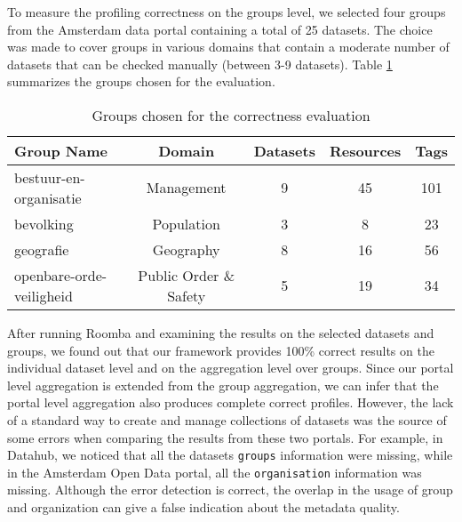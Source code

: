 To measure the profiling correctness on the groups level, we selected four groups from the Amsterdam data portal containing a total of 25 datasets. The choice was made to cover groups in various domains that contain a moderate number of datasets that can be checked manually (between 3-9 datasets). Table \ref{table:groups_experiment} summarizes the groups chosen for the evaluation.

\begin{table}[ht]
\centering
\begin{tabular}{|l|c|c|c|c|}
\hline
\textbf{Group Name}      & \textbf{Domain}        & \multicolumn{1}{l|}{\textbf{Datasets}} & \multicolumn{1}{l|}{\textbf{Resources}} & \multicolumn{1}{l|}{\textbf{Tags}} \\ \hline
bestuur-en-organisatie   & Management             & 9                                      & 45                                      & 101                                \\ \hline
bevolking                & Population             & 3                                      & 8                                       & 23                                 \\ \hline
geografie                & Geography              & 8                                      & 16                                      & 56                                 \\ \hline
openbare-orde-veiligheid & Public Order \& Safety & 5                                      & 19                                      & 34                                 \\ \hline
\end{tabular}
\caption{Groups chosen for the correctness evaluation}
\label{table:groups_experiment}
\end{table}

After running Roomba and examining the results on the selected datasets and groups, we found out that our framework provides 100\% correct results on the individual dataset level and on the aggregation level over groups. Since our portal level aggregation is extended from the group aggregation, we can infer that the portal level aggregation also produces complete correct profiles. However, the lack of a standard way to create and manage collections of datasets was the source of some errors when comparing the results from these two portals. For example, in Datahub, we noticed that all the datasets \texttt{groups} information were missing, while in the Amsterdam Open Data portal, all the \texttt{organisation} information was missing. Although the error detection is correct, the overlap in the usage of group and organization can give a false indication about the metadata quality.


